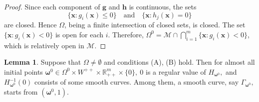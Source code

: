 \documentclass[11pt,pdflatex,sn-mathphys-ay]{sn-jnl}%
\theoremstyle{definition}
\theoremstyle{thmstyleone}%
\theoremstyle{thmstyletwo}%
\newtheorem{lemma}{Lemma}%
\theoremstyle{thmstylethree}%
\begin{document}
	\begin{proof}
		Since each component of $\bm g$ and $\bm h$ is continuous, the sets
		\[
		\{\bm x:g_i(\bm x)\le0\}
		\quad\text{and}\quad
		\{\bm x:h_j(\bm x)=0\}
		\]
		are closed. Hence $\Omega$, being a finite intersection of closed sets, is closed.
		The set $\{\bm x:g_i(\bm x)<0\}$
		is open for each $i$. Therefore, $\Omega^0 = \mathcal M \cap \bigcap_{i=1}^m \{\bm x:g_i(\bm x)<0\}$, 
		which is relatively open in $\mathcal M$.
	\end{proof}
	\begin{lemma}\label{zhengze}
		Suppose that $\Omega \ne \emptyset$ and conditions (A), (B)
		hold. Then for almost all initial points $\bm{\omega}^0\in
		\Omega^0\times W^{++}\times
		\mathbb{R}^{m}_{++}\times\{0\}, ~0$ is a regular value of $H_{\bm{\omega}^0},$ and $H_{\bm{\omega}^0}^{-1}(0)$
		consists of some smooth curves. Among them, a smooth curve, say
		$\Gamma_{\bm{\omega}^0},$  starts from $(\bm{\omega}^0, 1).$
	\end{lemma}
	\vspace{-0.5cm}
\end{document}
